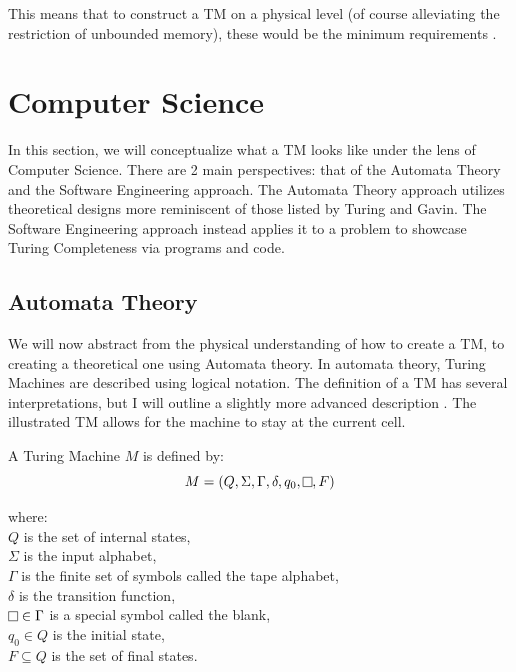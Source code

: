 This means that to construct a TM on a physical level (of course alleviating the restriction of unbounded memory), these would be the minimum requirements \cite{nand2tetris,ELTCompSys}.

\section{Computer Science}\label{sec:CompSci}

In this section, we will conceptualize what a TM looks like under the lens of Computer Science.
There are 2 main perspectives: that of the Automata Theory and the Software Engineering approach.
The Automata Theory approach utilizes theoretical designs more reminiscent of those listed by Turing and Gavin.
The Software Engineering approach instead applies it to a problem to showcase Turing Completeness via programs and code.

\subsection{Automata Theory}\label{subsec:AutomataThy}

We will now abstract from the physical understanding of how to create a TM, to creating a theoretical one using Automata theory.
In automata theory, Turing Machines are described using logical notation.
The definition of a TM has several interpretations, but I will outline a slightly more advanced description \cite{IntroFormLangAuto,TuBB}.
The illustrated TM allows for the machine to stay at the current cell.

\begin{definition}
    A Turing Machine $M$ is defined by:
        \[M = (Q, \Sigma ,\Gamma, \delta, q_{0}, \raisebox{0.1cm}{\fbox{}}, F)\]
        \par \hangindent=3cm 
        where: \\
        \( Q \) is the set of internal states,\\
        \( \Sigma \) is the input alphabet,\\
        \( \Gamma \) is the finite set of symbols called the tape alphabet,\\
        \( \delta \) is the transition function,\\
        \( \raisebox{0.1cm}{\fbox{}} \in \Gamma \) is a special symbol called the blank,\\
        \( q_{0} \in Q \) is the initial state,\\
        \( F \subseteq Q \) is the set of final states.
\end{definition}

